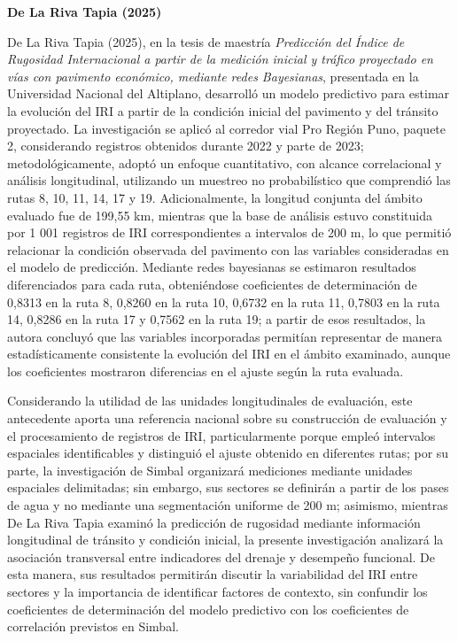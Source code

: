 \noindent\textbf{De La Riva Tapia (2025)}

De La Riva Tapia (2025), en la tesis de maestría \textit{Predicción del Índice de Rugosidad Internacional a partir de la medición inicial y tráfico proyectado en vías con pavimento económico, mediante redes Bayesianas}, presentada en la Universidad Nacional del Altiplano, desarrolló un modelo predictivo para estimar la evolución del IRI a partir de la condición inicial del pavimento y del tránsito proyectado. La investigación se aplicó al corredor vial Pro Región Puno, paquete 2, considerando registros obtenidos durante 2022 y parte de 2023; metodológicamente, adoptó un enfoque cuantitativo, con alcance correlacional y análisis longitudinal, utilizando un muestreo no probabilístico que comprendió las rutas 8, 10, 11, 14, 17 y 19. Adicionalmente, la longitud conjunta del ámbito evaluado fue de 199,55 km, mientras que la base de análisis estuvo constituida por 1 001 registros de IRI correspondientes a intervalos de 200 m, lo que permitió relacionar la condición observada del pavimento con las variables consideradas en el modelo de predicción. Mediante redes bayesianas se estimaron resultados diferenciados para cada ruta, obteniéndose coeficientes de determinación de 0,8313 en la ruta 8, 0,8260 en la ruta 10, 0,6732 en la ruta 11, 0,7803 en la ruta 14, 0,8286 en la ruta 17 y 0,7562 en la ruta 19; a partir de esos resultados, la autora concluyó que las variables incorporadas permitían representar de manera estadísticamente consistente la evolución del IRI en el ámbito examinado, aunque los coeficientes mostraron diferencias en el ajuste según la ruta evaluada.

Considerando la utilidad de las unidades longitudinales de evaluación, este antecedente aporta una referencia nacional sobre su construcción de evaluación y el procesamiento de registros de IRI, particularmente porque empleó intervalos espaciales identificables y distinguió el ajuste obtenido en diferentes rutas; por su parte, la investigación de Simbal organizará mediciones mediante unidades espaciales delimitadas; sin embargo, sus sectores se definirán a partir de los pases de agua y no mediante una segmentación uniforme de 200 m; asimismo, mientras De La Riva Tapia examinó la predicción de rugosidad mediante información longitudinal de tránsito y condición inicial, la presente investigación analizará la asociación transversal entre indicadores del drenaje y desempeño funcional. De esta manera, sus resultados permitirán discutir la variabilidad del IRI entre sectores y la importancia de identificar factores de contexto, sin confundir los coeficientes de determinación del modelo predictivo con los coeficientes de correlación previstos en Simbal.

